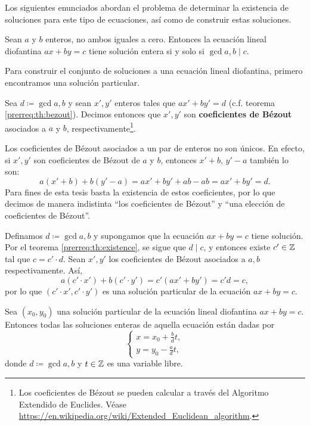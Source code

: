 Los siguientes enunciados abordan el problema de determinar la existencia de soluciones para este
tipo de ecuaciones, así como de construir estas soluciones.
\begin{theorem}[Existencia]
	\label{prerreq:th:existence}
	Sean $a$ y $b$ enteros, no ambos iguales a cero. Entonces la ecuación lineal diofantina $ax + by
	= c$ tiene solución entera si y solo si $\gcd{a, b} \mid c$.
\end{theorem}

Para construir el conjunto de soluciones a una ecuación lineal diofantina, primero encontramos  una
solución particular.
\begin{definition}
	\label{prerreq:def:bezout}
	Sea $d \coloneq \gcd{a, b}$ y sean $x', y'$ enteros tales que $ax' + by' = d$ (c.f. teorema
	\ref{prerreq:th:bezout}). Decimos entonces que $x', y'$ son \textbf{coeficientes de Bézout} asociados a
	$a$ y $b$, respectivamente\footnote{
		Los coeficientes de Bézout se pueden calcular a través del Algoritmo Extendido de Euclides.
		Véase \url{https://en.wikipedia.org/wiki/Extended_Euclidean_algorithm}.
	}.
\end{definition}

\begin{observation}
	Los coeficientes de Bézout asociados a un par de enteros no son únicos. En efecto, si $x', y'$
	son coeficientes de Bézout de $a$ y $b$, entonces $x' + b$, $y' - a$ también lo son:
	\begin{equation*}
		a(x' + b) + b(y' - a) = ax' + by' + ab - ab = ax' + by' = d.
	\end{equation*}
	Para fines de esta tesis basta la existencia de estos coeficientes, por lo que decimos de manera
	indistinta ``los coeficientes de Bézout'' y ``una elección de coeficientes de Bézout''.
\end{observation}

Definamos $d \coloneq \gcd{a, b}$ y supongamos que la ecuación $ax + by = c$ tiene solución.
Por el teorema \ref{prerreq:th:existence}, se sigue que $d \mid c$, y entonces existe $c' \in \mathbb{Z}$
tal que $c = c' \cdot d$. Sean $x', y'$ los coeficientes de Bézout asociados a $a, b$
respectivamente. Así,
\begin{equation*}
	a(c' \cdot x') + b(c' \cdot y') = c'(ax' + by') = c'd = c,
\end{equation*}
por lo que $(c' \cdot x', c' \cdot y')$ es una solución particular de la ecuación $ax + by = c$.

\begin{theorem}[Construcción]
	\label{prerreq:th:construction}
	Sea $(x_0, y_0)$ una solución particular de la ecuación lineal diofantina $ax + by = c$.
	Entonces todas las soluciones enteras de aquella ecuación están dadas por
	\begin{equation}
		\label{prerreq:eq:construction}
		\begin{cases}
			x = x_0 + \frac{b}{d}t, \\
			y = y_0 - \frac{a}{d}t,
		\end{cases}
	\end{equation}
	donde $d \coloneq \gcd{a, b}$ y $t \in \mathbb{Z}$ es una variable libre.
\end{theorem}

